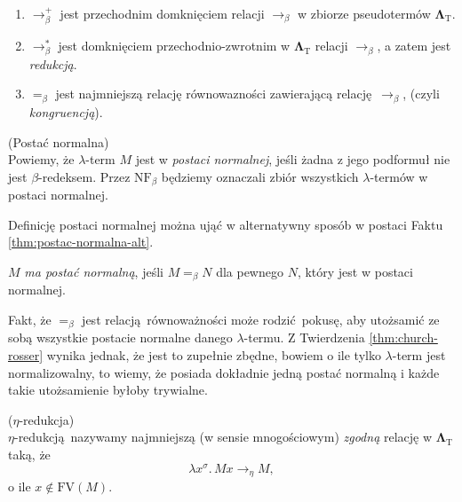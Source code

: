 \begin{enumerate}[label=B\arabic*.]
  \item \(\longrightarrow^{+}_{\beta}\) jest przechodnim domknięciem relacji \(\longrightarrow_{\beta}\) w zbiorze pseudotermów \(\mathbf{\Lambda}_{\mathrm{T}}\).

  \item \(\longrightarrow^{*}_{\beta}\) jest domknięciem przechodnio-zwrotnim w \(\mathbf{\Lambda}_{\mathrm{T}}\) relacji \(\longrightarrow_{\beta}\), a zatem jest \emph{redukcją}.

  \item \(=_{\beta}\) jest najmniejszą relację równowazności zawierającą relację \(\longrightarrow_{\beta}\), (czyli \emph{kongruencją}).
\end{enumerate}

\begin{definicja}\label{def:postac-normalna}(Postać normalna)\\
  Powiemy, że \(\lambda\)-term \(M\) jest w \emph{postaci normalnej}, jeśli żadna z jego podformuł nie jest \(\beta\)-redeksem. Przez \(\mathrm{NF}_{\beta}\) będziemy oznaczali zbiór wszystkich \(\lambda\)-termów w postaci normalnej.
\end{definicja}
Definicję postaci normalnej można ująć w alternatywny sposób w postaci Faktu \ref{thm:postac-normalna-alt}.

\begin{fakt}\label{thm:postac-normalna-alt}
\(M\) \emph{ma postać normalną}, jeśli \(M=_{\beta}N\) dla pewnego \(N\), który jest w postaci normalnej.
\end{fakt}
\begin{uwaga*}
Fakt, że \(=_{\beta}\) jest relacją równoważności może rodzić pokusę, aby utożsamić  ze sobą wszystkie postacie normalne danego \(\lambda\)-termu. Z Twierdzenia \ref{thm:church-rosser} wynika jednak, że jest to zupełnie zbędne, bowiem o ile tylko \(\lambda\)-term jest normalizowalny, to wiemy, że posiada dokładnie jedną postać normalną i każde takie utożsamienie byłoby trywialne.
\end{uwaga*}

  \begin{definicja}(\(\eta\)-redukcja)\\
\(\eta\)-redukcją nazywamy najmniejszą (w sensie mnogościowym) \emph{zgodną} relację w \(\mathbf{\Lambda}_{\mathrm{T}}\) taką, że
  \[
    \lambda x^\sigma.\, Mx\longrightarrow_{\eta} M,
  \]
    o ile \(x\not\in \mathrm{FV}(M)\).
  \end{definicja}

